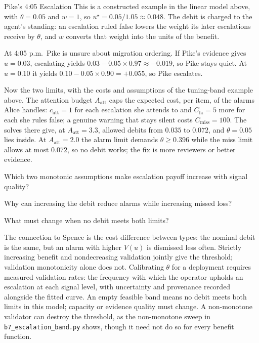 \documentclass[11pt,a4paper]{article}
\theoremstyle{definition}
\theoremstyle{plain}
\begin{document}
\begin{pdexample}{Pike's 4:05 Escalation}
\setlength{\parskip}{4pt plus 1pt}
This is a constructed example in the linear model above, with $\theta=0.05$
and $w=1$, so $u^\star=0.05/1.05\approx0.048$. The debit is charged to the
agent's standing: an escalation ruled false lowers the weight its later
escalations receive by $\theta$, and $w$ converts that weight into the units
of the benefit.

At 4:05 p.m.\ Pike is unsure about migration ordering. If Pike's evidence gives
$u=0.03$, escalating yields $0.03-0.05\times0.97\approx-0.019$, so Pike stays
quiet. At $u=0.10$ it yields $0.10-0.05\times0.90=+0.055$, so Pike escalates.

Now the two limits, with the costs and assumptions of the tuning-band example
above. The attention budget $A_{\mathrm{att}}$ caps the expected cost, per item, of the alarms
Alice handles: $c_{\mathrm{att}}=1$ for each escalation she attends to and
$C_{\mathrm{fa}}=5$ more for each she rules false; a genuine warning that stays
silent costs $C_{\mathrm{miss}}=100$. The solves there give, at $A_{\mathrm{att}}=3.3$,
allowed debits from $0.035$ to $0.072$, and $\theta=0.05$ lies inside. At
$A_{\mathrm{att}}=2.0$ the alarm limit demands $\theta\ge0.396$ while the miss limit allows at
most $0.072$, so no debit works; the fix is more reviewers or better evidence.
\end{pdexample}
\pdexercisepointer*{\ref{ex:ls-adversarial-review-corollary}}{\ref{ex:ls-b7-escalation-run}}{\pageref{ex:ls-adversarial-review-corollary}}

\begin{pdrecitation}
\item Which two monotonic assumptions make escalation payoff increase with signal quality?
\item Why can increasing the debit reduce alarms while increasing missed loss?
\item What must change when no debit meets both limits?
\end{pdrecitation}

The connection to Spence is the cost difference between types: the nominal
debit is the same, but an alarm with higher $V(u)$ is dismissed less often.
Strictly increasing benefit and nondecreasing validation jointly give the
threshold; validation monotonicity alone does not. Calibrating $\theta$ for a
deployment requires measured validation rates: the frequency with which the
operator upholds an escalation at each signal level, with uncertainty and
provenance recorded alongside the fitted curve.
An empty feasible band means no debit meets both limits in this model; capacity
or evidence quality must change. A non-monotone validator can destroy the
threshold, as the non-monotone sweep in \texttt{b7\_escalation\_band.py} shows, though it need not do so for
every benefit function.
\end{document}
